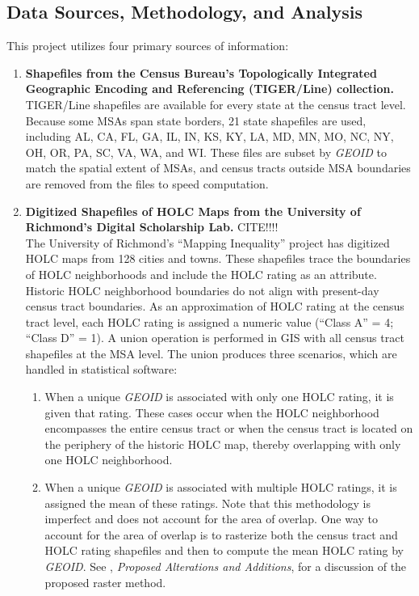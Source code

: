 \documentclass[paper=letter, fontsize=12pt]{scrartcl} %
\begin{document}
\subsection{Data Sources, Methodology, and Analysis}
This project utilizes four primary sources of information:
\begin{enumerate}
	\item \textbf{Shapefiles from the Census Bureau's Topologically Integrated Geographic Encoding and Referencing (TIGER/Line) collection.} \cite{tiger17}\\
	TIGER/Line shapefiles are available for every state at the census tract level. Because some MSAs span state borders, 21 state shapefiles are used, including AL, CA, FL, GA, IL, IN, KS, KY, LA, MD, MN, MO, NC, NY, OH, OR, PA, SC, VA, WA, and WI. These files are subset by \textit{GEOID} to match the spatial extent of MSAs, and census tracts outside MSA boundaries are removed from the files to speed computation.
	\item \textbf{Digitized Shapefiles of HOLC Maps from the University of Richmond's Digital Scholarship Lab.} CITE!!!! \\
	The University of Richmond's ``Mapping Inequality'' project has digitized HOLC maps from 128 cities and towns. These shapefiles trace the boundaries of HOLC neighborhoods and include the HOLC rating as an attribute. Historic HOLC neighborhood boundaries do not align with present-day census tract boundaries. As an approximation of HOLC rating at the census tract level, each HOLC rating is assigned a numeric value (``Class A'' = 4; ``Class D'' = 1). A union operation is performed in GIS with all census tract shapefiles at the MSA level. The union produces three scenarios, which are handled in statistical software:
	\begin{enumerate}
		\item When a unique \textit{GEOID} is associated with only one HOLC rating, it is given that rating. These cases occur when the HOLC neighborhood encompasses the entire census tract or when the census tract is located on the periphery of the historic HOLC map, thereby overlapping with only one HOLC neighborhood.
		\item When a unique \textit{GEOID} is associated with multiple HOLC ratings, it is assigned the mean of these ratings. Note that this methodology is imperfect and does not account for the area of overlap. One way to account for the area of overlap is to rasterize both the census tract and HOLC rating shapefiles and then to compute the mean HOLC rating by \textit{GEOID}. See , \textit{Proposed Alterations and Additions}, for a discussion of the proposed raster method.

\end{enumerate}
\end{enumerate}
\end{document}
